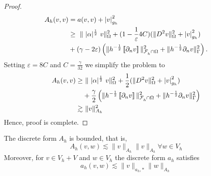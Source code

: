 \begin{proof}
    \[
        \begin{split}
     A_{h}( v,v) & = a( v,v) + \left\lvert  v  \right\rvert_{g_{h}}^{2} \\
     &\ge  \   \| \ |\alpha|^{\frac{1}{2}} \  v  \|_{   \Omega   }^{2} + (1  - \frac{1}{\varepsilon } 4C)  (\| D^2 v \|_{ \Omega  }^{ 2 }  + \left\lvert  v  \right\rvert _{ g_{h} }^{2  } )  \\
                       & + (\gamma - 2\varepsilon  )\left( \|h^{-\frac{1}{2}}  \left[\!\left[  \partial _{n} v  \right]\!\right]\|_{\mathcal{F} _{h}^{}\cap \Omega   }^{ 2 } + \| h^{-\frac{1}{2}} \partial _{n} v \|_{ \Gamma  }^{ 2} \right)        .
        \end{split}
    \]
    Setting $\varepsilon = 8C$ and $C=\frac{\gamma }{32} $ we simplify the problem to \[
        \begin{split}
           A_{h}( v,v)  \ge& \   \| \ |\alpha|^{\frac{1}{2}} \    v  \|_{  \Omega   }^{2} + \frac{1}{2}  (\| D^2 v \|_{ \Omega  }^{ 2 }  + \left\lvert  v  \right\rvert _{ g_{h} }^{2  } )  \\
                       & + \frac{\gamma }{2}\left( \|h^{-\frac{1}{2}}  \left[\!\left[  \partial _{n} v  \right]\!\right]\|_{\mathcal{F} _{h}^{}\cap \Omega   }^{ 2 } + \| h^{-\frac{1}{2}} \partial _{n} v \|_{ \Gamma  }^{ 2} \right) \\
                        \gtrsim & \  \| v \|_{ A_{h} }^{2  }
        \end{split}
    \]
    Hence, proof is complete.
\end{proof}


\begin{lemma}
    \label{lemma:bi_Ah_bounded}
    The discrete form $A_{h}$ is bounded, that is,
    \begin{equation}
    \label{eq:bi_A_h_bounded}
     A_{h}( v,w) \lesssim \| v \|_{A_{h}  }^{  }\| v \|_{A_{h}  }^{  }  \forall w \in V_{h}
    \end{equation}
    Moreover, for $v \in V_{h} + V$  and $w \in V_{h}$ the discrete form $a_{h}$ satisfies
    \begin{equation}
        \label{eq:bi_a_h_bounded}
        a_{h} ( v,w) \lesssim \| v \|_{ a_{h},* }^{  } \| w \|_{ A_{h} }^{  }
    \end{equation}
\end{lemma}

